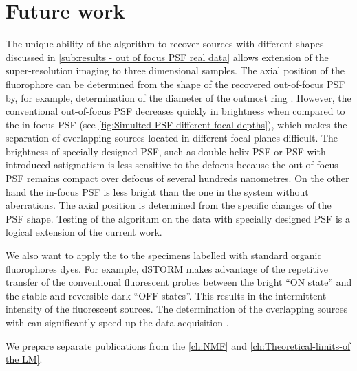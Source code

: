 \chapter{Future work\label{ch:Future work}}

The unique ability of the \inmf{} algorithm to recover sources with different shapes discussed in \autoref{sub:results - out of focus PSF real data} allows extension of the super-resolution imaging to three dimensional samples. The axial position of the fluorophore can be determined from the shape of the recovered out-of-focus PSF by, for example, determination of the diameter of the outmost ring \cite{Speidel2003}. However, the conventional out-of-focus PSF decreases quickly in brightness when compared to the in-focus PSF (see \autoref{fig:Simulted-PSF-different-focal-depths}), which makes the separation of overlapping sources located in different focal planes difficult. The brightness of specially designed PSF, such as double helix PSF \cite{Quirin2011} or PSF with introduced astigmatism \cite{Huang2008} is less sensitive to the defocus because the out-of-focus PSF remains compact over defocus of several hundreds nanometres. On the other hand the in-focus PSF is less bright than the one in the system without aberrations. The axial position is determined from the specific changes of the PSF shape. Testing of the \inmf{} algorithm on the data with specially designed PSF is a logical extension of the current work. 

We also want to apply the \inmf{} to the specimens labelled with standard organic fluorophores dyes. For example, dSTORM \cite{VandeLinde2011} makes advantage of the repetitive transfer of the conventional fluorescent probes between the bright ``ON state''  and the stable and reversible dark ``OFF states''. This results in the intermittent intensity of the fluorescent sources. The determination of the overlapping sources with \inmf{} can significantly speed up the data acquisition \cite{Small2009}.

We prepare separate publications from the \autoref{ch:NMF} and \autoref{ch:Theoretical-limits-of the LM}. 
